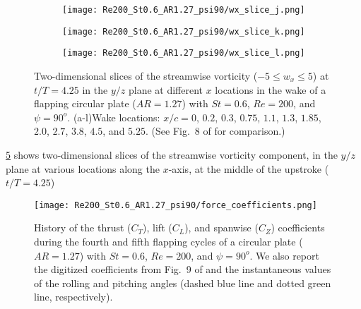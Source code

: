 \begin{figure}[H]
\begin{subfigure}[t]{0.24\textwidth}
    \caption{}
    \label{fig:baseline_wx_slices:i}
  \end{subfigure}
  \begin{subfigure}[t]{0.24\textwidth}
    \centering
    \texttt{[image: Re200\_St0.6\_AR1.27\_psi90/wx\_slice\_j.png]}
    \caption{}
    \label{fig:baseline_wx_slices:j}
  \end{subfigure}
  \begin{subfigure}[t]{0.24\textwidth}
    \centering
    \texttt{[image: Re200\_St0.6\_AR1.27\_psi90/wx\_slice\_k.png]}
    \caption{}
    \label{fig:baseline_wx_slices:k}
  \end{subfigure}
  \begin{subfigure}[t]{0.24\textwidth}
    \centering
    \texttt{[image: Re200\_St0.6\_AR1.27\_psi90/wx\_slice\_l.png]}
    \caption{}
    \label{fig:baseline_wx_slices:l}
  \end{subfigure}
  \caption{Two-dimensional slices of the streamwise vorticity ($-5 \leq w_x \leq 5$) at $t / T = 4.25$ in the $y/z$ plane at different $x$ locations in the wake of a flapping circular plate ($AR = 1.27$) with $St = 0.6$, $Re = 200$, and $\psi = 90^o$. (a-l)Wake locations: $x / c = 0$, $0.2$, $0.3$, $0.75$, $1.1$, $1.3$, $1.85$, $2.0$, $2.7$, $3.8$, $4.5$, and $5.25$. (See Fig.~8 of \citet{li_dong_2016} for comparison.)}
  \label{fig:baseline_wx_slices}
\end{figure}

\cref{fig:baseline_wx_slices} shows two-dimensional slices of the streamwise vorticity component, in the $y/z$ plane at various locations along the $x$-axis, at the middle of the upstroke ($t/T = 4.25$)

\begin{figure}[!h]
  \centering
  \texttt{[image: Re200\_St0.6\_AR1.27\_psi90/force\_coefficients.png]}
  \caption{History of the thrust ($C_T$), lift ($C_L$), and spanwise ($C_Z$) coefficients during the fourth and fifth flapping cycles of a circular plate ($AR = 1.27$) with $St = 0.6$, $Re = 200$, and $\psi = 90^o$. We also report the digitized coefficients from Fig.~9 of \cite{li_dong_2016} and the instantaneous values of the rolling and pitching angles (dashed blue line and dotted green line, respectively).}
  \label{fig:baseline_force_coefficients}
\end{figure}

